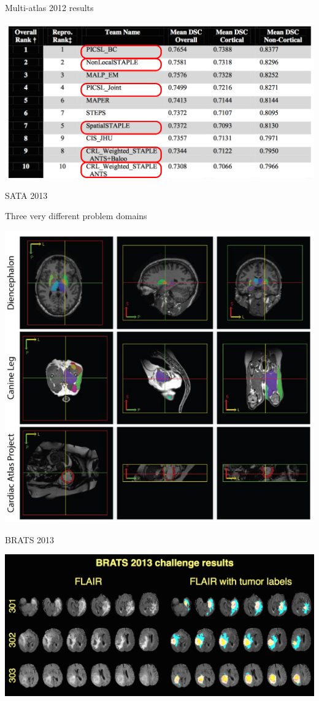 \documentclass[ignorenonframetext,]{beamer}
\begin{document}
\begin{frame}{Multi-atlas 2012 results}

\includegraphics{./competitions/figures/MALF2012.png}

\end{frame}

\begin{frame}{SATA 2013}

Three very different problem domains

\includegraphics{./competitions/figures/SATA_data.png}

\end{frame}

\begin{frame}{BRATS 2013}

\includegraphics{./competitions/figures/brats2013results1.png}

\end{frame}
\end{document}
